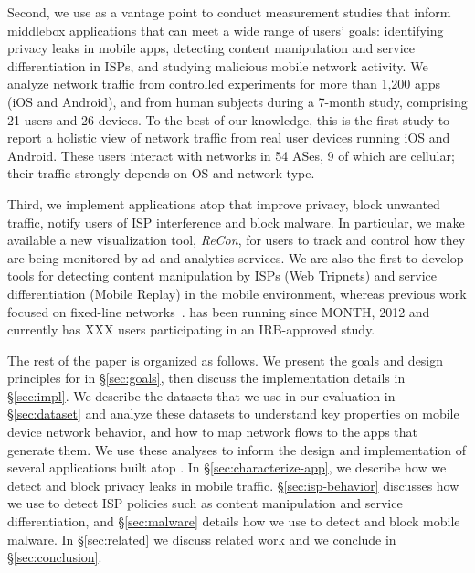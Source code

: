 Second, we use \meddle as a vantage point to conduct measurement studies that inform 
middlebox applications that can meet a wide range of users' goals: identifying privacy leaks in mobile apps, detecting content 
manipulation and service differentiation in ISPs, and studying malicious mobile network activity. We analyze network traffic from controlled experiments for more than 1,200 apps (iOS and Android), 
and from human subjects during a 7-month study, comprising 21 users and 26 devices. To the best of our knowledge, this is the first study to report a holistic 
view of network traffic from real user devices running iOS and Android. These users interact with networks in 54 ASes, 9 of which are	 cellular; their traffic 
strongly depends on OS and network type.


Third, we implement applications atop \meddle that improve 
privacy, block unwanted traffic, notify users of ISP interference and block malware. 
In particular, we make available a new visualization tool, \emph{ReCon}, for users to track and control how 
they are being monitored by ad and analytics services. 
 We are also the first to develop tools for detecting content manipulation by ISPs (Web Tripnets) and 
 service differentiation (Mobile Replay) in the mobile environment, whereas previous work focused on 
 fixed-line networks~\cite{reis:tripwires,dischinger:glasnost}. 
\meddle has been running since 
MONTH, 2012 and currently has XXX users participating in an IRB-approved study. 






The rest of the paper is organized as follows. We present the goals and design principles for \meddle in \S\ref{sec:goals}, then 
discuss the implementation details in \S\ref{sec:impl}. We describe the datasets that we use in our evaluation in \S\ref{sec:dataset} and 
analyze these datasets to understand key properties on mobile device network behavior, and how to map network flows to the 
apps that generate them. We use these analyses to inform the design and implementation of several applications built atop \meddle. 
In \S\ref{sec:characterize-app}, we describe how we detect and block privacy leaks in mobile traffic. \S\ref{sec:isp-behavior} discusses 
how we use \meddle to detect ISP policies such as content manipulation and service differentiation, and \S\ref{sec:malware} details 
how we use \meddle to detect and block mobile malware. In \S\ref{sec:related} we discuss related work and we conclude in \S\ref{sec:conclusion}.

